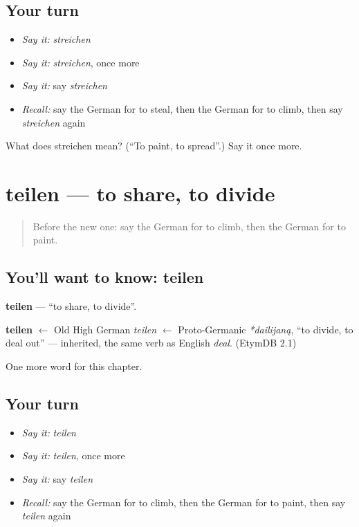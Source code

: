 \subsection*{Your turn}
\begin{itemize}
\raggedright
  \item \emph{Say it:} \emph{streichen}
  \item \emph{Say it:} \emph{streichen}, once more
  \item \emph{Say it:} say \emph{streichen}
  \item \emph{Recall:} say the German for to steal, then the German for to climb, then say \emph{streichen} again
\end{itemize}

\begin{tcolorbox}[breakable,colback=teal!4,colframe=teal!35!black,title={Before you move on}]
What does streichen mean? (\textquotedblleft{}To paint, to spread\textquotedblright{}.) Say it once more.
\end{tcolorbox}
\section[teilen]{teilen — to share, to divide}

\label{lesson:GE-C188-teilen}



\begin{quote}
Before the new one: say the German for to climb, then the German for to paint.
\end{quote}

\subsection*{You'll want to know: teilen}
\textbf{teilen} — \textquotedblleft{}to share, to divide\textquotedblright{}.

\begin{cousinweb}
\textbf{teilen} $\leftarrow$ Old High German \emph{teilen} $\leftarrow$ Proto-Germanic \emph{*dailijaną}, \textquotedblleft{}to divide, to deal out\textquotedblright{} — inherited, the same verb as English \emph{deal}. (EtymDB 2.1)
\end{cousinweb}

\begin{grammarlens}[title={What you've built}]
One more word for this chapter.
\end{grammarlens}

\subsection*{Your turn}
\begin{itemize}
\raggedright
  \item \emph{Say it:} \emph{teilen}
  \item \emph{Say it:} \emph{teilen}, once more
  \item \emph{Say it:} say \emph{teilen}
  \item \emph{Recall:} say the German for to climb, then the German for to paint, then say \emph{teilen} again
\end{itemize}


